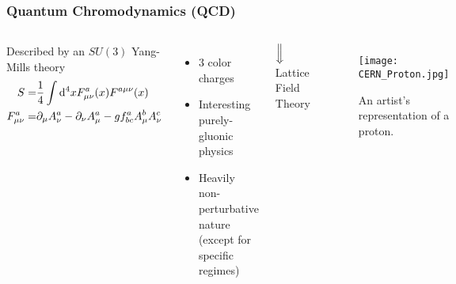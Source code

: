 \documentclass{beamer}
\begin{document}
\begin{frame}
  \frametitle{Quantum Chromodynamics (QCD)}
  \centering
{}
  \begin{columns}[c]
      \centering
      Described by an $\mathit{SU}(3)$ Yang-Mills theory
      \begin{align*}
        S =& \frac14\int\dd^4x F^a_{\mu\nu}(x)F^{a\mu\nu}(x)\\
        F^a_{\mu\nu} =& \partial_\mu A^a_\nu - \partial_\nu A^a_\mu -g f^a_{bc} A^b_\mu A^c_\nu
      \end{align*}
      \begin{itemize} 
        \item<2-> $3$ color charges
        \item<3-> Interesting purely-gluonic physics
        \item<4-> Heavily non-perturbative nature (except for specific regimes)
      \end{itemize}
      $\Big\Downarrow$\\
      \vspace{0.5\baselineskip}
      Lattice Field Theory
      \centering
{}
      \begin{figure}[t]
        \texttt{[image: CERN\_Proton.jpg]}
        \caption{An artist's representation of a proton\cite{protonImg}.}
        \vspace{0.5\baselineskip}
      \end{figure}
  \end{columns}
\end{frame}
\end{document}
